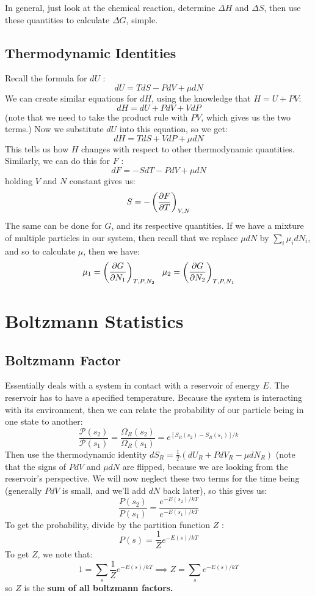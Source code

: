 \documentclass[10pt]{article}
\begin{document}
	In general, just look at the chemical reaction, determine \( \Delta H \) and \( \Delta S \), then use these quantities
	to calculate \( \Delta G \), simple. 

	\subsection{Thermodynamic Identities}
	Recall the formula for \( dU \) :
	\[
	dU = T dS - P dV + \mu dN
	\] 
	We can create similar equations for \( dH \), using the knowledge that \( H = U + PV \):
	\[
	dH = dU + P dV + V dP
	\] 
	(note that we need to take the product rule with \( PV \), which gives us the two terms.) Now we substitute \( dU \) into 
	this equation, so we get:
	\[
	dH = T dS + V dP + \mu dN
	\] 
	This tells us how \( H \) changes with respect to other thermodynamic quantities. Similarly, we can do this for \( F \) :
	\[
	dF = - S dT - P dV + \mu dN
	\] 
	holding \( V \) and \( N \) constant gives us:
	\[
		S = -\left( \pdv{F}{T} \right)_{V, N}
	\] 
	The same can be done for \( G \), and its respective quantities. If we have a mixture of multiple particles in our system, 
	then recall that we replace \( \mu dN \) by \( \sum_i \mu_i dN_i \), and so to calculate \( \mu \), then we have:
	\[
		\mu_1 = \left( \pdv{G}{N_1} \right)_{T, P, N_2} \ \ \mu_2 = \left( \pdv{G}{N_2} \right)_{T, P, N_1}
	\] 
	\section{Boltzmann Statistics}
	\subsection{Boltzmann Factor}
	Essentially deals with a system in contact with a reservoir of energy \( E \). The reservoir has to have a 
	specified temperature. Because the system is interacting with its environment, then we can relate the probability of our particle 
	being in one state to another:
	\[
		\frac{\mathcal P(s_2)}{\mathcal P(s_1)} = \frac{\Omega_R(s_2)}{\Omega_R(s_1)} = e^{[S_R(s_2) - S_R(s_1)] / k}
	\] 
	Then use the thermodynamic identity \( dS_R = \frac{1}{T}(dU_R + P dV_R - \mu dN_R) \) (note that the signs of 
	\( P dV \) and \( \mu dN \) are flipped, because we are looking from the reservoir's perspective. We will 
	now neglect these two terms for the time being (generally \( P dV \) is small, and we'll add \( dN \) back later), 
	so this gives us:
	\[
		\frac{P(s_2)}{P(s_1)} = \frac{e^{-E(s_2) / kT}}{e^{-E(s_1) / kT}}
	\] 
	To get the probability, divide by the partition function \( Z \) :
	\[
	P(s) = \frac{1}{Z} e^{-E(s) / kT}
	\] 
	To get \( Z \), we note that:
	\[
	1 = \sum_s \frac{1}{Z} e^{ -E(s) / kT} \implies Z = \sum_s e^{-E(s) / kT}
	\] 
	so \( Z \) is the \textbf{sum of all boltzmann factors.}
\end{document}
